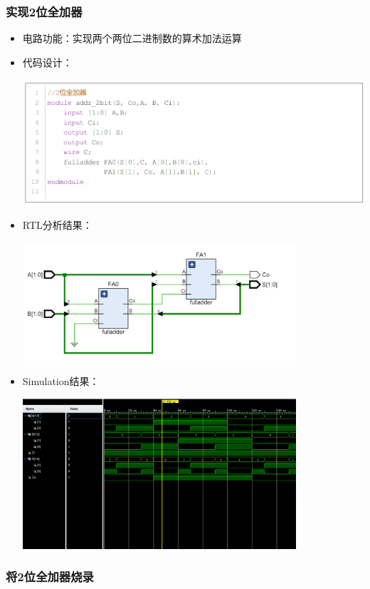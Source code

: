 \documentclass[a4,10pt,zihao=-4]{ctexart}
\begin{document}
\subsubsection{实现2位全加器}
\begin{itemize}
\item
  电路功能：实现两个两位二进制数的算术加法运算
\item
  代码设计：
  
  \includegraphics[width=1\textwidth]{2bitadder_Code.png}
\item

  RTL分析结果：
  
  \includegraphics[width=0.8\textwidth]{2bitadder_RTL.png}
\item

  Simulation结果：
  
  \includegraphics[width=0.8\textwidth]{2bitadder_Simulation.png}
\end{itemize}

\subsubsection{将2位全加器烧录}
\end{document}

